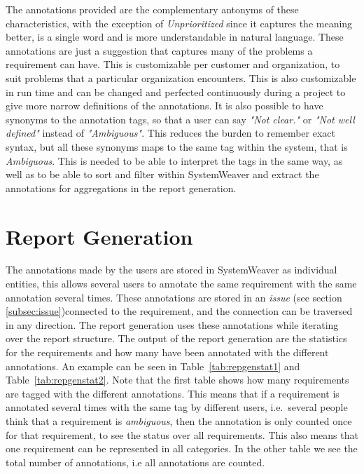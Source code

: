 The annotations provided are the complementary antonyms of these characteristics, with the exception of \emph{Unprioritized} since it captures the meaning better, is a single word and is more understandable in natural language. These annotations are just a suggestion that captures many of the problems a requirement can have. This is customizable per customer and organization, to suit problems that a particular organization encounters. This is also customizable in run time and can be changed and perfected continuously during a project to give more narrow definitions of the annotations. It is also possible to have synonyms to the annotation tags, so that a user can say \emph{"Not clear."} or \emph{"Not well defined"} instead of \emph{"Ambiguous"}. This reduces the burden to remember exact syntax, but all these synonyms maps to the same tag within the system, that is \emph{Ambiguous}. This is needed to be able to interpret the tags in the same way, as well as to be able to sort and filter within SystemWeaver and extract the annotations for aggregations in the report generation.

\FloatBarrier
\section{Report Generation}
\label{sec:repgen}
The annotations made by the users are stored in SystemWeaver as individual entities, this allows several users to annotate the same requirement with the same annotation several times. These annotations are stored in an \emph{issue} (see section \ref{subsec:issue})connected to the requirement, and the connection can be traversed in any direction. The report generation uses these annotations while iterating over the report structure. The output of the report generation are the statistics for the requirements and how many have been annotated with the different annotations. An example can be seen in Table~\ref{tab:repgenstat1} and Table~\ref{tab:repgenstat2}. Note that the first table shows how many requirements are tagged with the different annotations. This means that if a requirement is annotated several times with the same tag by different users, i.e.\ several people think that a requirement is \textit{ambiguous}, then the annotation is only counted once for that requirement, to see the status over all requirements. This also means that one requirement can be represented in all categories. In the other table we see the total number of annotations, i.e all annotations are counted.

